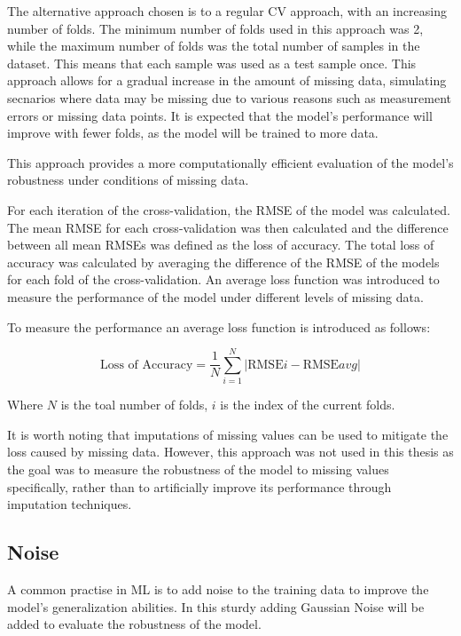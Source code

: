 The alternative approach chosen is to a regular \ac{CV} approach, with an
increasing
number of folds.
The minimum number of folds used in this approach was 2, while the maximum
number of folds was
the total number of samples in the dataset. This means that each sample was
used as a test sample
once.
This approach allows for a gradual increase in the amount of missing data,
simulating secnarios
where data may be missing due to various reasons such as measurement errors
or missing data points.
It is expected that the
model's performance will improve with fewer folds, as the model will be
trained to more data.

This approach provides a more computationally efficient evaluation of the
model's robustness
under conditions of missing data.

For each iteration of the cross-validation, the \ac{RMSE} of the model was
calculated.
The mean \ac{RMSE} for each cross-validation was then calculated and the
difference
between all mean RMSEs was defined as the loss of accuracy.
The total loss of accuracy was calculated by averaging the difference of the
RMSE of the models
for each fold of the
cross-validation.
An average loss function was introduced to measure the performance of the
model under different
levels of missing data.

To measure the performance an average loss function is introduced as follows:

\begin{tcolorbox}[arc=0pt,boxrule=0.5pt]
    \begin{equation}
        \label{eq:average_loss}
        \text{Loss of Accuracy} = \frac{1}{N} \sum_{i=1}^{N} |\text{RMSE}i -
        \text{RMSE}{avg}|
    \end{equation}
\end{tcolorbox}

Where $N$ is the toal number of folds, $i$ is the index of the current folds.

It is worth noting that imputations of missing values can be used to mitigate
the loss
caused by missing data.
However, this approach was not used in this thesis as the goal
was to measure the robustness of the model to missing values specifically,
rather than to
artificially improve its performance through imputation techniques.

\subsection{Noise}\label{subsec:noise}
A common practise in \ac{ML} is to add noise to the training data to improve
the model's
generalization abilities.
In this sturdy adding Gaussian Noise will be added to evaluate the robustness
of the model.

